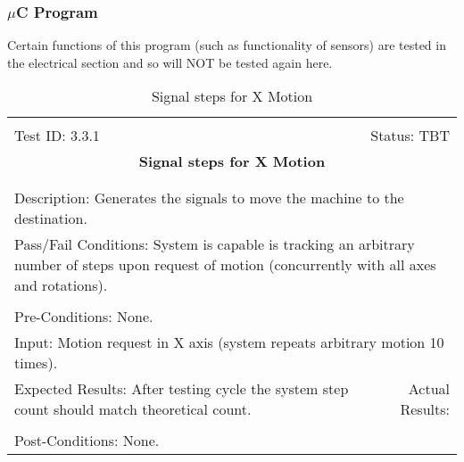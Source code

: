 \documentclass[titlepage]{article}
\begin{document}
\subsubsection{$\mu$C Program}
Certain functions of this program (such as functionality of sensors) are tested in the electrical section and so will NOT be tested again here.

\begin{center}%
\begin{table}[h!]
\begin{tabular}{|l r|}\hline&\\[-2mm]
	Test ID: 3.3.1	&Status: TBT\\[-3mm]
	\multicolumn{2}{|c|}{\textbf{\large{Signal steps for X Motion}}}\\&\\\hline&\\[-3mm]
	\multicolumn{2}{|p{\textwidth}|}{Description: Generates the signals to move the machine to the destination.}\\\hline
	\multicolumn{2}{|p{\textwidth}|}{Pass/Fail Conditions: System is capable is tracking an arbitrary number of steps upon request of motion (concurrently with all axes and rotations).}\\[1mm]\hline&\\[-3mm]
	\multicolumn{2}{|p{\textwidth}|}{Pre-Conditions: None.}\\[4mm]
	\multicolumn{2}{|p{\textwidth}|}{Input: Motion request in X axis (system repeats arbitrary motion 10 times).}\\[2mm]\hline
	\multicolumn{1}{|p{0.49\textwidth}}{Expected Results: After testing cycle the system step count should match theoretical count.}	&\multicolumn{1}{|p{0.45\textwidth}|}{Actual Results: }\\\hline&\\[-3mm]
	\multicolumn{2}{|p{\textwidth}|}{Post-Conditions: None.}\\\hline
\end{tabular}
\caption{Signal steps for X Motion}
\end{table}
\end{center}
\end{document}
